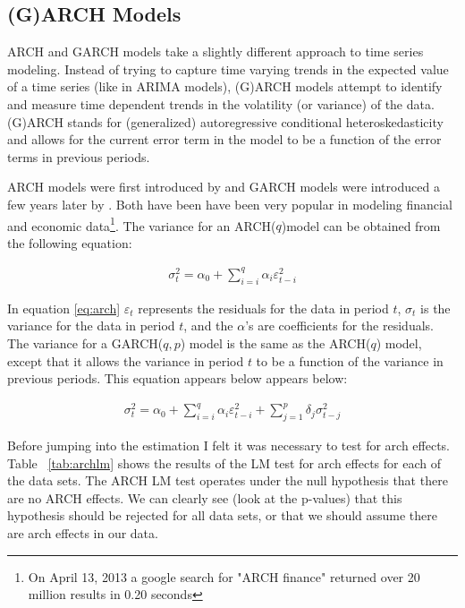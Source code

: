 \documentclass[a4paper, 11pt, twoside]{article}
\newcommand\ve{\varepsilon} %
\theoremstyle{definition} %
\numberwithin{equation}{section}
\begin{document}
  \subsection{(G)ARCH Models} \label{sub:garch}

    ARCH and GARCH models take a slightly different approach to time series modeling. Instead of trying to capture time varying trends in the expected value of a time series (like in ARIMA models), (G)ARCH models attempt to identify and measure time dependent trends in the volatility (or variance) of the data. (G)ARCH stands for (generalized) autoregressive conditional heteroskedasticity and allows for the current error term in the model to be a function of the error terms in previous periods.

    ARCH models were first introduced by \cite{Engle:1982} and GARCH models were introduced a few years later by \cite{Bollerslev:1986}. Both have been have been very popular in modeling financial and economic data\footnote{On April 13, 2013 a google search for "ARCH finance" returned over 20 million results in 0.20 seconds}. The variance for an ARCH($q$)model can be obtained from the following equation:

    \begin{align}
      \sigma^2_t = \alpha_0 +  \sum_{i=i}^q \alpha_i \ve_{t-i}^2 \label{eq:arch}
    \end{align}

    In equation \eqref{eq:arch} $\ve_t$ represents the residuals for the data in period $t$, $\sigma_t$ is the variance for the data in period $t$, and the $\alpha$'s  are coefficients for the residuals. The variance for a GARCH($q, p$) model is the same as  the ARCH($q$) model, except that it allows the variance in period $t$ to be a function of the variance in previous periods. This equation appears below appears below:

    \begin{align}
      \sigma^2_t = \alpha_0 +  \sum_{i=i}^q \alpha_i \ve_{t-i}^2 + \sum_{j=1}^p \delta_j\sigma_{t - j}^2 \label{eq:garch}
    \end{align}

    Before jumping into the estimation I felt it was necessary to test for arch effects. Table ~\ref{tab:archlm} shows the results of the LM test for arch effects for each of the data sets. The ARCH LM test operates under the null hypothesis that there are no ARCH effects. We can clearly see  (look at the p-values) that this hypothesis should be rejected for all data sets, or that we should assume there are arch effects in our data.
\end{document}
